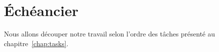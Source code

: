 \chapter{Échéancier}
\label{chap:sched}

  Nous allons découper notre travail selon l'ordre des tâches présenté au
  chapitre~\ref{chap:tasks}.

  \todo{}
